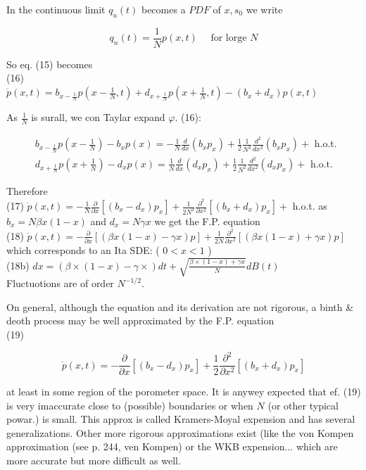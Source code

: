 \documentclass[10pt]{article}
\begin{document}
In the continuous limit $q_{u}(t)$ becomes a $P D F$ of $x, s_{0}$ we write

$$
q_{n}(t)=\frac{1}{N} p(x, t) \quad \text { for lorge } N
$$

So eq. (15) becomes\\
(16)\\
$\dot{p}(x, t)=b_{x-\frac{1}{N}} p\left(x-\frac{1}{N}, t\right)+d_{x+\frac{1}{N}} p\left(x+\frac{1}{N}, t\right)-\left(b_{x}+d_{x}\right) p(x, t)$

As $\frac{1}{N}$ is surall, we con Taylar expand $\varphi$. (16):

$$
\begin{aligned}
& b_{x-\frac{1}{N}} p\left(x-\frac{1}{N}\right)-b_{x} p(x)=-\frac{1}{N} \frac{d}{d x}\left(b_{x} p_{x}\right)+\frac{1}{2} \frac{1}{N^{2}} \frac{d^{2}}{d x^{2}}\left(b_{x} p_{x}\right)+\text { h.o.t. } \\
& d_{x+\frac{1}{N}} p\left(x+\frac{1}{N}\right)-d_{x} p(x)=\frac{1}{N} \frac{d}{d x}\left(d_{x} p_{x}\right)+\frac{1}{2} \frac{1}{N^{2}} \frac{d^{2}}{d x^{2}}\left(d_{x} p_{x}\right)+\text { h.o.t. }
\end{aligned}
$$

Therefore\\
(17) $\dot{p}(x, t)=-\frac{1}{N} \frac{\partial}{\partial x}\left[\left(b_{x}-d_{x}\right) p_{x}\right]+\frac{1}{2 N^{2}} \frac{\partial^{2}}{\partial x^{2}}\left[\left(b_{x}+d_{x}\right) p_{x}\right]+$ h.o.t. as $b_{x}=N \beta x(1-x)$ and $d_{x}=N \gamma x$ we get the F.P. equation\\
(18) $\dot{p}(x, t)=-\frac{\partial}{\partial x}[(\beta x(1-x)-\gamma x) p]+\frac{1}{2 N} \frac{\partial^{2}}{\partial x^{2}}[(\beta x(1-x)+\gamma x) p]$\\
which corresponds to an Ita SDE: ( $0<x<1$ )\\
(18b) $d x=(\beta \times(1-x)-\gamma \times) d t+\sqrt{\frac{\beta \times(1-x)+\gamma x}{N}} d B(t)$\\
Fluctuotions are of order $N^{-1 / 2}$.

On general, although the equation and its derivation are not rigorous, a binth \& deoth process may be well approximated by the F.P. equation\\
(19)

$$
\dot{p}(x, t)=-\frac{\partial}{\partial x}\left[\left(b_{x}-d_{x}\right) p_{x}\right]+\frac{1}{2} \frac{\partial^{2}}{\partial x^{2}}\left[\left(b_{x}+d_{x}\right) p_{x}\right]
$$

at least in some region of the porometer space. It is anywey expected that ef. (19) is very imaccurate close to (possible) boundaries or when $N$ (or other typical powar.) is small. This approx is called Kramers-Moyal expension and has several generalizations. Other more rigorous approximations exist (like the von Kompen approximation (see p. 244, ven Kompen) or the WKB expension... which are more accurate but more difficult as well.
\end{document}

